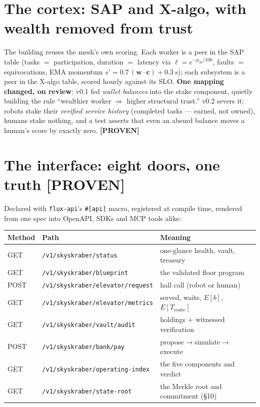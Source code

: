 \documentclass[11pt,a4paper]{article}
\newcommand{\claim}[1]{\textcolor{qsteel}{\textbf{\footnotesize[#1]}}}
\begin{document}
\section{The cortex: SAP and X-algo, with wealth removed from trust}

The building reuses the mesh's own scoring. Each worker is a peer in the SAP
table (tasks $=$ participation, duration $=$ latency via $\ell = e^{-p_{50}/100}$,
faults $=$ equivocations, EMA momentum $s' = 0.7\,(\mathbf{w}\cdot\mathbf{c}) +
0.3\,s$); each subsystem is a peer in the X-algo table, scored hourly against its
SLO. \textbf{One mapping changed, on review}: v0.1 fed \emph{wallet balances} into
the stake component, quietly building the rule ``wealthier worker $\Rightarrow$
higher structural trust.'' v0.2 severs it: robots stake their \emph{verified
service history} (completed tasks --- earned, not owned), humans stake nothing,
and a test asserts that even an absurd balance moves a human's score by exactly
zero. \claim{PROVEN}

\section{The interface: eight doors, one truth \hfill \claim{PROVEN}}

Declared with \texttt{flux-api}'s \texttt{\#[api]} macro, registered at compile
time, rendered from one spec into OpenAPI, SDKs and MCP tools alike:

\begin{center}\small
\begin{tabular}{@{}lll@{}}
\toprule
Method & Path & Meaning \\
\midrule
GET & \texttt{/v1/skyskraber/status} & one-glance health, vault, treasury \\
GET & \texttt{/v1/skyskraber/blueprint} & the validated floor program \\
POST & \texttt{/v1/skyskraber/elevator/request} & hall call (robot or human) \\
GET & \texttt{/v1/skyskraber/elevator/metrics} & served, waits, $E[b]$, $E[T_{\text{route}}]$ \\
GET & \texttt{/v1/skyskraber/vault/audit} & holdings $+$ witnessed verification \\
POST & \texttt{/v1/skyskraber/bank/pay} & propose$\to$simulate$\to$execute \\
GET & \texttt{/v1/skyskraber/operating-index} & the five components and verdict \\
GET & \texttt{/v1/skyskraber/state-root} & the Merkle root and commitment (\S10) \\
\bottomrule
\end{tabular}
\end{center}
\end{document}
